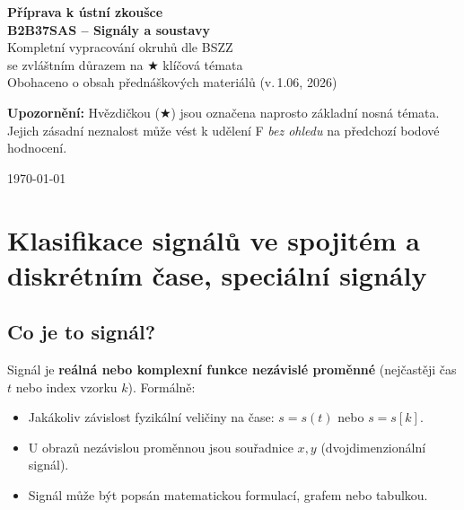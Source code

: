 \documentclass[12pt,a4paper]{article}
\begin{document}
\begin{titlepage}
  \centering
  \vspace*{2cm}
  {\Huge\bfseries\color{hlavicka} Příprava k ústní zkoušce\\[0.4em]
   \LARGE B2B37SAS – Signály a soustavy}\\[1.5cm]
  {\large Kompletní vypracování okruhů dle BSZZ\\
   se zvláštním důrazem na $\bigstar$ klíčová témata}\\[0.5cm]
  {\normalsize Obohaceno o obsah přednáškových materiálů (v.\,1.06, 2026)}\\[1cm]
  \begin{tcolorbox}[colback=pozadihv,colframe=hvezdicka,width=0.85\linewidth]
    \centering
    \textbf{Upozornění:} Hvězdičkou ($\bigstar$) jsou označena naprosto základní nosná témata.
    Jejich zásadní neznalost může vést k udělení F \emph{bez ohledu} na předchozí bodové hodnocení.
  \end{tcolorbox}
  \vfill
  {\large\today}
\end{titlepage}

\tableofcontents
\newpage

\section{Klasifikace signálů ve spojitém a diskrétním čase, speciální signály}

\begin{hvezdBox}
\subsection*{Co je to signál?}
\end{hvezdBox}

Signál je \textbf{reálná nebo komplexní funkce nezávislé proměnné} (nejčastěji čas $t$ nebo index vzorku $k$). Formálně:

\begin{itemize}[leftmargin=1.5em]
  \item Jakákoliv závislost fyzikální veličiny na čase: $s = s(t)$ nebo $s = s[k]$.
  \item U obrazů nezávislou proměnnou jsou souřadnice $x, y$ (dvojdimenzionální signál).
  \item Signál může být popsán matematickou formulací, grafem nebo tabulkou.
\end{itemize}
\end{document}
